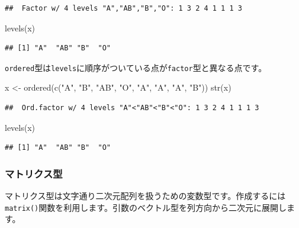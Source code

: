 \documentclass[
  12pt,
]{book}
\newenvironment{Shaded}{\begin{snugshade}}{\end{snugshade}}
\newcommand{\FunctionTok}[1]{\textcolor[rgb]{0.00,0.00,0.00}{#1}}
\newcommand{\NormalTok}[1]{#1}
\newcommand{\OtherTok}[1]{\textcolor[rgb]{0.56,0.35,0.01}{#1}}
\newcommand{\StringTok}[1]{\textcolor[rgb]{0.31,0.60,0.02}{#1}}
\begin{document}
\begin{verbatim}
##  Factor w/ 4 levels "A","AB","B","O": 1 3 2 4 1 1 1 3
\end{verbatim}

\begin{Shaded}
\begin{Highlighting}[]
\FunctionTok{levels}\NormalTok{(x)}
\end{Highlighting}
\end{Shaded}

\begin{verbatim}
## [1] "A"  "AB" "B"  "O"
\end{verbatim}

\texttt{ordered}型は\texttt{levels}に順序がついている点が\texttt{factor}型と異なる点です。

\begin{Shaded}
\begin{Highlighting}[]
\NormalTok{x }\OtherTok{\textless{}{-}} \FunctionTok{ordered}\NormalTok{(}\FunctionTok{c}\NormalTok{(}\StringTok{"A"}\NormalTok{, }\StringTok{"B"}\NormalTok{, }\StringTok{"AB"}\NormalTok{, }\StringTok{"O"}\NormalTok{, }\StringTok{"A"}\NormalTok{, }\StringTok{"A"}\NormalTok{, }\StringTok{"A"}\NormalTok{, }\StringTok{"B"}\NormalTok{))}
\FunctionTok{str}\NormalTok{(x)}
\end{Highlighting}
\end{Shaded}

\begin{verbatim}
##  Ord.factor w/ 4 levels "A"<"AB"<"B"<"O": 1 3 2 4 1 1 1 3
\end{verbatim}

\begin{Shaded}
\begin{Highlighting}[]
\FunctionTok{levels}\NormalTok{(x)}
\end{Highlighting}
\end{Shaded}

\begin{verbatim}
## [1] "A"  "AB" "B"  "O"
\end{verbatim}

\hypertarget{ux30deux30c8ux30eaux30afux30b9ux578b}{%
\subsubsection{マトリクス型}\label{ux30deux30c8ux30eaux30afux30b9ux578b}}

マトリクス型は文字通り二次元配列を扱うための変数型です。作成するには\texttt{matrix()}関数を利用します。引数のベクトル型を列方向から二次元に展開します。
\end{document}
